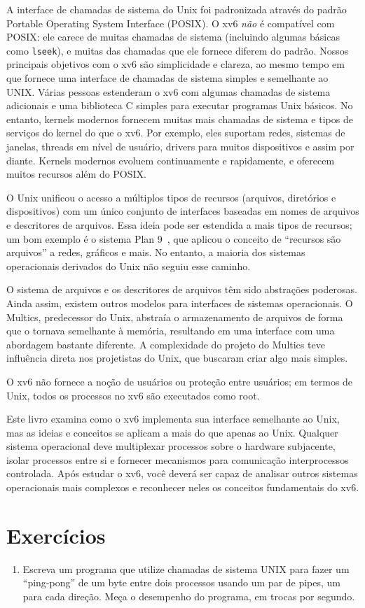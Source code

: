 A interface de chamadas de sistema do Unix foi padronizada através do padrão
Portable Operating System Interface (POSIX).
O xv6
\textit{não}
é compatível com POSIX: ele carece de muitas chamadas de sistema (incluindo algumas básicas como
\lstinline{lseek}),
e muitas das chamadas que ele fornece diferem do padrão.
Nossos principais objetivos com o xv6 são
simplicidade e clareza, ao mesmo tempo em que fornece uma interface de chamadas de sistema simples e semelhante ao UNIX.
Várias pessoas estenderam o xv6 com algumas chamadas de sistema adicionais e uma biblioteca C simples para executar programas Unix básicos.
No entanto, kernels modernos fornecem muitas mais chamadas de sistema e tipos de serviços do kernel do que o xv6.
Por exemplo, eles suportam redes, sistemas de janelas, threads em nível de usuário,
drivers para muitos dispositivos e assim por diante.
Kernels modernos evoluem continuamente e rapidamente,
e oferecem muitos recursos além do POSIX.

O Unix unificou o acesso a múltiplos tipos de recursos (arquivos,
diretórios e dispositivos) com um único conjunto de interfaces
baseadas em nomes de arquivos e descritores de arquivos.
Essa ideia pode ser estendida a mais tipos de recursos;
um bom exemplo é o sistema Plan 9~\cite{Presotto91plan9},
que aplicou o conceito de “recursos são arquivos”
a redes, gráficos e mais.
No entanto, a maioria dos sistemas operacionais derivados do Unix
não seguiu esse caminho.

O sistema de arquivos e os descritores de arquivos têm sido abstrações poderosas.
Ainda assim, existem outros modelos para interfaces de sistemas operacionais.
O Multics, predecessor do Unix,
abstraía o armazenamento de arquivos de forma que o tornava semelhante à memória,
resultando em uma interface com uma abordagem bastante diferente.
A complexidade do projeto do Multics teve influência direta
nos projetistas do Unix, que buscaram criar algo mais simples.

O xv6 não fornece a noção de usuários ou proteção
entre usuários; em termos de Unix, todos os processos no xv6
são executados como root.

Este livro examina como o xv6 implementa sua interface semelhante ao Unix,
mas as ideias e conceitos se aplicam a mais do que apenas ao Unix.
Qualquer sistema operacional deve multiplexar processos sobre o
hardware subjacente, isolar processos entre si
e fornecer mecanismos para comunicação interprocessos controlada.
Após estudar o xv6, você deverá ser capaz de
analisar outros sistemas operacionais mais complexos
e reconhecer neles os conceitos fundamentais do xv6.

\section{Exercícios}

\begin{enumerate}

\item Escreva um programa que utilize chamadas de sistema UNIX para
fazer um “ping-pong” de um byte entre dois processos usando um par
de pipes, um para cada direção. Meça o
desempenho do programa, em trocas por segundo.

\end{enumerate}

